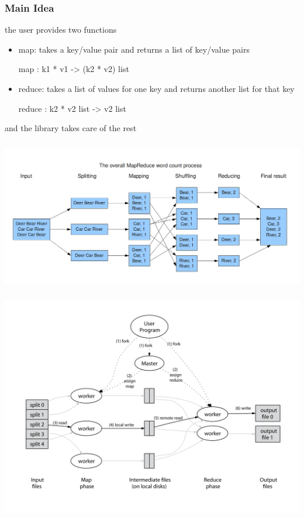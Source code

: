 \documentclass{beamer}
\let\emph\alert
\begin{document}
\begin{frame}\frametitle{Main Idea}
  the user provides two functions
  \begin{itemize}
  \item \emph{map}: takes a key/value pair and returns a list of key/value
    pairs
    \begin{ocaml}
    map : k1 * v1 -> (k2 * v2) list
    \end{ocaml}



  \item \emph{reduce}: takes a list of values for one key and returns
    another list for that key
    \begin{ocaml}
    reduce : k2 * v2 list -> v2 list
    \end{ocaml}
  \end{itemize}



  and the library takes care of the rest
\end{frame}

\begin{frame}\frametitle{}
  \begin{center}
    \includegraphics[width=\textwidth]{mrwordcount}
  \end{center}
\end{frame}

\begin{frame}\frametitle{}
  \begin{center}
    \includegraphics[width=\textwidth]{mrfigure}
  \end{center}
\end{frame}
\end{document}
